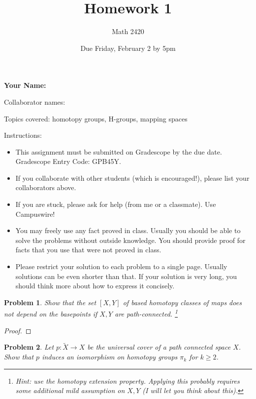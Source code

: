 \documentclass[11pt]{article}
\author{Math 2420}
\date{Due Friday, February 2 by 5pm}
\title{Homework 1}
\newtheorem{problem}{Problem}
\begin{document}
\maketitle

{\bf\Large Your Name:} 

Collaborator names: 


\vspace{.3in}
Topics covered: homotopy groups, H-groups, mapping spaces

Instructions: 
\begin{itemize}
\item This assignment must be submitted on Gradescope by the due date. Gradescope Entry Code: GPB45Y. 
\item If you collaborate with other students (which is encouraged!), please list your collaborators above. 
\item If you are stuck, please ask for help (from me or a classmate). Use Campuswire!  
\item You may freely use any fact proved in class. Usually you should be able to solve the problems without outside knowledge. You should provide proof for facts that you use that were not proved in class. 
\item Please restrict your solution to each problem to a single page. Usually solutions can be even shorter than that. If your solution is very long, you should think more about how to express it concisely.
\end{itemize}
\pagebreak 


\pagebreak 
\begin{problem}
Show that the set $[X,Y]$ of based homotopy classes of maps does not depend on the basepoints if $X,Y$ are path-connected. \footnote{Hint: use the homotopy extension property. Applying this probably requires some additional mild assumption on $X,Y$ (I will let you think about this).} 
\end{problem}

\begin{proof}

\end{proof}

\pagebreak 


\begin{problem}
Let $p:\tilde X\to X$ be the universal cover of a path connected space $X$. Show that $p$ induces an isomorphism on homotopy groups $\pi_k$ for $k\ge2$. 
\end{problem}
\end{document}

